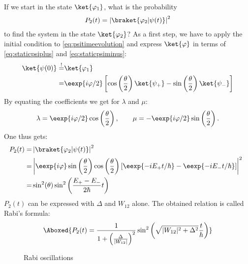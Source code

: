 				If we start in the state $\ket{\varphi_1}$, what is the probability
				\begin{align}
					P_2(t)=\left|\braket{\varphi_2|\psi(t)}\right|^2
				\end{align}
				to find the system in the state $\ket{\varphi_2}$? As a first step, we have to apply the initial condition to \eqref{eq:psitimeevolution} and express $\ket{\varphi}$ in terms of \eqref{eq:staticpsiplus} and \eqref{eq:staticpsiminus}:
				\begin{align}
					\ket{\psi(0)} \overset{!}{=}& \ket{\varphi_1}\\
											  = & \eexp{i{\varphi}/{2}} \left[ \cos\left( \frac{\theta}{2}\right) \ket{\psi_+}-\sin\left(\frac{\theta}{2}\right)\ket{\psi_-}\right]
				\end{align}
				By equating the coefficients we get for $\lambda$ and $\mu$:
				\begin{align}
					\lambda = \eexp{i{\varphi}/{2}}\cos\left(\frac{\theta}{2}\right), \qquad  \mu = -\eexp{i{\varphi}/{2}}\sin\left(\frac{\theta}{2}\right).
				\end{align}
				One thus gets:
				\begin{align}
					\hspace{-2mm} P_2(t)	=&\left|\braket{\varphi_2|\psi(t)}\right|^2 \\
											=& \left|\eexp{i\varphi} \sin\left(\frac{\theta}{2}\right)\cos\left(\frac{\theta}{2}\right)\left[\eexp{-i{E_+}t/{\hbar}} - \eexp{-i{E_-}t/{\hbar}}\right]\right|^2\\
											=& \sin^2(\theta)\sin^2\left(\frac{E_+-E_-}{2\hbar}t\right)
				\end{align}
				$P_2(t)$ can be expressed with $\Delta$ and $W_{12}$ alone. The obtained relation is called Rabi's formula:
				\begin{align}
					\Aboxed{P_2(t)=\frac{1}{1+\left(\frac{\Delta}{|W_{12}|}\right)^2}\sin^2\left(\sqrt{|W_{12}|^2+\Delta^2}\frac{t}{\hbar}\right)}
				\end{align}

				\begin{figure}
					\begin{center}
						\caption{Rabi oscillations}
					\end{center}
				\end{figure}